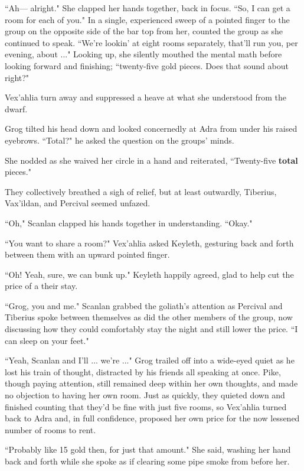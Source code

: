 ``Ah--- alright." She clapped her hands together, back in focus. ``So, I can get a room for each of you." In a single, experienced sweep of a pointed finger to the group on the opposite side of the bar top from her, counted the group as she continued to speak. ``We're lookin' at eight rooms separately, that'll run you, per evening, about ..." Looking up, she silently mouthed the mental math before looking forward and finishing; ``twenty-five gold pieces. Does that sound about right?"

Vex'ahlia turn away and suppressed a heave at what she understood from the dwarf.

Grog tilted his head down and looked concernedly at Adra from under his raised eyebrows. ``Total?" he asked the question on the groups' minds.

She nodded as she waived her circle in a hand and reiterated, ``Twenty-five \textbf{total} pieces." 

They collectively breathed a sigh of relief, but at least outwardly, Tiberius, Vax'ildan, and Percival seemed unfazed.

``Oh," Scanlan clapped his hands together in understanding. ``Okay."

``You want to share a room?" Vex'ahlia asked Keyleth, gesturing back and forth between them with an upward pointed finger.

``Oh! Yeah, sure, we can bunk up." Keyleth happily agreed, glad to help cut the price of a their stay.

``Grog, you and me." Scanlan grabbed the goliath's attention as Percival and Tiberius spoke between themselves as did the other members of the group, now discussing how they could comfortably stay the night and still lower the price. ``I can sleep on your feet."

``Yeah, Scanlan and I'll ... we're ..." Grog trailed off into a wide-eyed quiet as he lost his train of thought, distracted by his friends all speaking at once. Pike, though paying attention, still remained deep within her own thoughts, and made no objection to having her own room. Just as quickly, they quieted down and finished counting that they'd be fine with just five rooms, so Vex'ahlia turned back to Adra and, in full confidence, proposed her own price for the now lessened number of rooms to rent.

``Probably like 15 gold then, for just that amount." She said, washing her hand back and forth while she spoke as if clearing some pipe smoke from before her.


